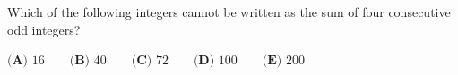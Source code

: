 Which of the following integers cannot be written as the sum of four consecutive odd integers?

$\textbf{(A) }16\qquad\textbf{(B) }40\qquad\textbf{(C) }72\qquad\textbf{(D) }100\qquad\textbf{(E) }200$
